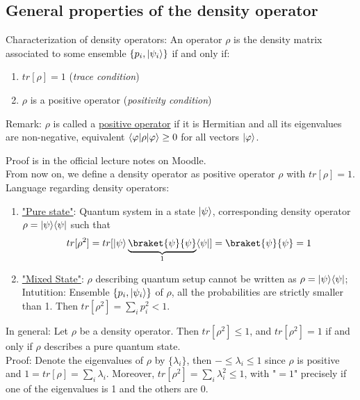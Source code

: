\subsection{General properties of the density operator}

Characterization of density operators: An operator $\rho$ is the
density matrix associated to some ensemble $\{p_i, \lvert\psi_i\rangle \}$ if and only if:
\begin{enumerate}
    \item $tr[\rho] = 1$ (\textit{trace condition})
    \item $\rho$ is a positive operator (\textit{positivity condition})
\end{enumerate}
Remark: $\rho$ is called a \underline{positive operator} if it is Hermitian and all its
eigenvalues are non-negative, equivalent 
$\left \langle \varphi \middle| \rho \middle| \varphi \right \rangle \geq 0$ for all vectors $\lvert\varphi\rangle$. 

Proof is in the official lecture notes on Moodle. \\

From now on, we define a density operator as positive operator $\rho$ with
$tr[\rho] = 1$. \\
Language regarding density operators: \\
\begin{enumerate}
    \item \underline{"Pure state"}: Quantum system in a state $\lvert\psi\rangle$, corresponding density 
operator $\rho = \lvert\psi\rangle \langle\psi\rvert$ such that 
\begin{equation}
    tr[\rho^2] = tr[\ket{\psi} \underbrace{\braket{\psi}{\psi}}_{1} \bra{\psi}] 
    = \braket{\psi}{\psi} = 1
\end{equation}

    \item \underline{"Mixed State"}: $\rho$ describing quantum setup cannot be written 
    as $\rho = \lvert\psi\rangle \langle\psi\rvert$; Intutition: Ensemble $\{p_i, \lvert\psi_i\rangle \}$ of 
    $\rho$, all the probabilities are strictly smaller than 1. 
    Then $tr[\rho^2] = \sum_i p_i^2 < 1$.
\end{enumerate}

In general: Let $\rho$ be a density operator. Then  $tr[\rho^2] \leq 1$, 
and $tr[\rho^2] = 1$ if and only if $\rho$ describes a pure quantum state. \\
Proof: Denote the eigenvalues of $\rho$ by $\{\lambda_i \}$, then $- \leq \lambda_i \leq 1$
since $\rho$ is positive and $1 = tr[\rho] = \sum_i \lambda_i$.
Moreover, $tr[\rho^2] = \sum_i \lambda_i^2 \leq 1$, with "$=1$" precisely if one of the 
eigenvalues is 1 and the others are 0. \\


